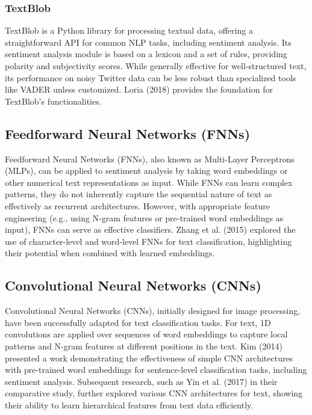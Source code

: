 \subsubsection{TextBlob}

TextBlob is a Python library for processing textual data, offering a straightforward API for common NLP tasks, including sentiment analysis. Its sentiment analysis module is based on a lexicon and a set of rules, providing polarity and subjectivity scores. While generally effective for well-structured text, its performance on noisy Twitter data can be less robust than specialized tools like VADER unless customized. Loria (2018) \cite{loria2018textblob} provides the foundation for TextBlob's functionalities.




\subsection{Feedforward Neural Networks (FNNs)}

Feedforward Neural Networks (FNNs), also known as Multi-Layer Perceptrons (MLPs), can be applied to sentiment analysis by taking word embeddings or other numerical text representations as input. While FNNs can learn complex patterns, they do not inherently capture the sequential nature of text as effectively as recurrent architectures. However, with appropriate feature engineering (e.g., using N-gram features or pre-trained word embeddings as input), FNNs can serve as effective classifiers. Zhang et al. (2015) \cite{zhang2015character} explored the use of character-level and word-level FNNs for text classification, highlighting their potential when combined with learned embeddings.

\subsection{Convolutional Neural Networks (CNNs)}


Convolutional Neural Networks (CNNs), initially designed for image processing, have been successfully adapted for text classification tasks. For text, 1D convolutions are applied over sequences of word embeddings to capture local patterns and N-gram features at different positions in the text. Kim (2014) \cite{kim2014convolutional} presented a work demonstrating the effectiveness of simple CNN architectures with pre-trained word embeddings for sentence-level classification tasks, including sentiment analysis. Subsequent research, such as Yin et al. (2017) \cite{yin2017comparative} in their comparative study, further explored various CNN architectures for text, showing their ability to learn hierarchical features from text data efficiently.



